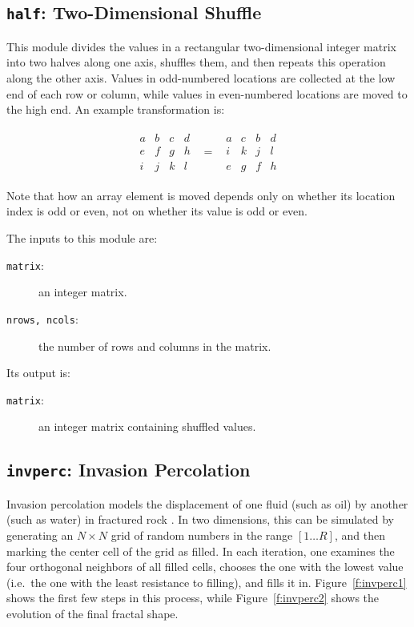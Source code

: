 \subsection{{\tt{half}}:
	Two-Dimensional Shuffle
	\label{s:toys-half}}

This module divides the values in a rectangular two-dimensional integer matrix into two halves along one axis,
shuffles them,
and then repeats this operation along the other axis.
Values in odd-numbered locations are collected at the low end of each row or column,
while values in even-numbered locations are moved to the high end.
An example transformation is:

\begin{eqnarray*}
\begin{array}{cccc}
a & b & c & d \\
e & f & g & h \\
i & j & k & l
\end{array}
& = &
\begin{array}{cccc}
a & c & b & d \\
i & k & j & l \\
e & g & f & h
\end{array}
\end{eqnarray*}

Note that how an array element is moved depends only on whether its location index is odd or even,
not on whether its value is odd or even.

The inputs to this module are:
\begin{description}
\item[{\tt{matrix}}:]
	an integer matrix.
\item[{\tt{nrows, ncols}}:]
	the number of rows and columns in the matrix.
\end{description}
Its output is:
\begin{description}
\item[{\tt{matrix}}:]
	an integer matrix containing shuffled values.
\end{description}

\subsection{{\tt{invperc}}:
	Invasion Percolation
	\label{s:toys-invperc}}

Invasion percolation models the displacement of one fluid
(such as oil)
by another
(such as water)
in fractured rock \cite{b:percolation-theory,b:invasion-percolation}.
In two dimensions,
this can be simulated by generating
an $N{\times}N$ grid of random numbers in the range $[1{\ldots}R]$,
and then marking the center cell of the grid as filled.
In each iteration,
one examines the four orthogonal neighbors of all filled cells,
chooses the one with the lowest value
(i.e.\ the one with the least resistance to filling),
and fills it in.
Figure~\ref{f:invperc1} shows the first few steps in this process,
while Figure~\ref{f:invperc2} shows the evolution of the final fractal shape.


